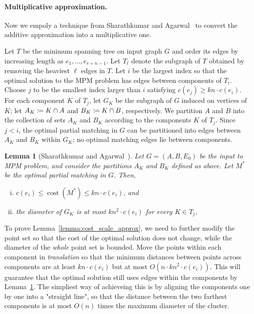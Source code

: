 \documentclass[11pt]{article}
\makeatletter
\def\polylog{\mathop{\mathrm{polylog}}}
\def\cost{\operatorname{cost}}
\theoremstyle{plain}
\newtheorem{lemma}{Lemma}[section]
\numberwithin{figure}{section}
\def\EMPH#1{\textbf{\boldmath #1}}
\def\n@te#1{\textsf{\boldmath \textbf{$\langle\!\langle$#1$\rangle\!\rangle$}}\leavevmode}
\def\note#1{\textcolor{red}{\n@te{#1}}}
\makeatother
\begin{document}
\paragraph{Multiplicative approximation.}
Now we empoly a technique from Sharathkumar and Agarwal~\cite{SA12} to convert the additive approximation into a multiplicative one.

Let $T$ be the minimum spanning tree on input graph $G$ and order
its edges by increasing length as $e_1, \ldots, e_{r+n-1}$.
Let $T_\ell$ denote the subgraph of $T$ obtained by removing the heaviest $\ell$ edges in $T$.
%
Let $i$ be the largest index so that
the optimal solution to the MPM problem has edges between components of $T_i$.
Choose $j$ to be the smallest index larger than $i$ satisfying
$c(e_j) \geq kn \cdot c(e_i)$.
For each component $K$ of $T_j$, let
$G_K$ be the subgraph of $G$ induced on vertices of $K$;
let $\EMPH{$A_K$} \coloneqq K \cap A$ and $\EMPH{$B_K$} \coloneqq K \cap B$, respectively.
We partition $A$ and $B$ into the collection of sets $A_K$ and $B_K$ according to the components $K$ of $T_j$.
Since $j < i$, the optimal partial matching in $G$ can be partitioned into edges between $A_K$ and $B_K$ within $G_K$; no optimal matching edges lie between components.

\begin{lemma}[Sharathkumar and Agarwal~{\cite[\S3.5]{SA12}}]
\label{lemma:sa_partition}
%
Let $G = (A,B,E_0)$ be the input to MPM problem, and consider the partitions $A_K$ and $B_K$ defined as above.
Let $M^*$ be the optimal partial matching in $G$.
Then,
\begin{enumerate}[(i)]
\item $c(e_i) \leq \cost(M^*) \le kn \cdot c(e_i)$, and
\item the diameter of $G_K$ is at most $kn^2 \cdot c(e_i)$ for every $K \in T_j$,
\end{enumerate}
\end{lemma}

To prove Lemma~\ref{lemma:cost_scale_approx}, we need to further modify the point set so that the cost of the optimal solution does not change, while the diameter of the \emph{whole} point set is bounded.
%
Move the points within each component in \emph{translation} so that the minimum distances between points across components are at least $kn \cdot c(e_i)$ but at most $O(n \cdot kn^2 \cdot c(e_i))$.  This will guarantee that the optimal solution still uses edges within the components by Lemma~\ref{lemma:sa_partition}.  The simpliest way of achieveing this is by aligning the components one by one into a "straight line", so that the distance between the two farthest components is at most $O(n)$ times the maximum diameter of the cluster.
\end{document}
